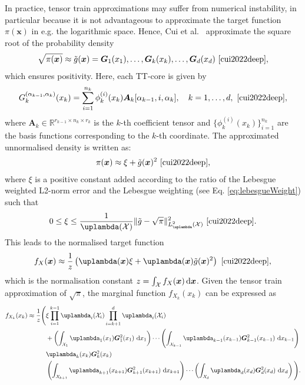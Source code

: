 In practice, tensor train approximations may suffer from numerical instability, in particular because it is not advantageous to approximate the target function $\pi(\bm{x})$ in e.g. the logarithmic space. 
Hence, Cui et al.~\cite{cui2022deep} approximate the square root of the probability density
\begin{align}
	\sqrt{\pi(\bm{x})} \approx \tilde{g}(\bm{x}) = \bm{G}_1(x_1), \dots, \bm{G}_k(x_k), \dots, \bm{G}_d(x_d)\, \,  \text{\cite[Eq. 18]{cui2022deep}},
\end{align}
which ensures positivity.
Here, each TT-core is given by
\begin{equation}
	G^{(\alpha_{k-1},\alpha_k)}_k(x_k) = \sum_{i=1}^{n_k} \phi^{(i)}_k(x_k) \bm{A}_k[\alpha_{k-1}, i, \alpha_k], \quad k = 1, \dots, d,\, \,  \text{\cite[Eq. 21]{cui2022deep}},
\end{equation}
where $\bm{A}_k \in \mathbb{R}^{r_{k-1} \times n_k \times r_k}$ is the $k$-th coefficient tensor and $\{\phi^{(i)}_k(x_k)\}_{i=1}^{n_k}$ are the basis functions corresponding to the $k$-th coordinate.
The approximated unnormalised density is written as:
\begin{align}
	\pi(\bm{x}) \approx \xi + \tilde{g}(\bm{x})^2\, \,  \text{\cite[Eq. 19]{cui2022deep}},
\end{align}
where $\xi$ is a positive constant added according to the ratio of the Lebesgue weighted L2-norm error and the Lebesgue weighting (see Eq. \ref{eq:lebesgueWeight}) such that
\begin{align}
	0 \leq \xi \leq \frac{1}{\uplambda(\mathcal{X})} \lVert \tilde{g} - \sqrt{\pi} \rVert_{L^2_{\uplambda}(\mathcal{X})}^2\, \,  \text{\cite[Eq. 35]{cui2022deep}}. \label{eq:gamErr}
\end{align}
This leads to the normalised target function
\begin{align}
	f_X(\bm{x})  \approx \frac{1}{z} \left( \uplambda(\bm{x}) \xi  + \uplambda(\bm{x}) \tilde{g}(\bm{x})^2 \right)\, \,  \text{\cite[Eq. 19]{cui2022deep}},
\end{align}
which is the normalisation constant $z = \int_{\mathcal{X}} f_X(\bm{x}) \mathop{}\!\mathrm{d} \bm{x} $.
Given the tensor train approximation of $\sqrt{\pi}$, the marginal function $f_{X_k}(x_k)$ can be expressed as
\begin{align}
	\begin{split}
		f_{X_k}(x_k)  \approx \frac{1}{z} \Bigg(&\xi \prod_{i=1}^{k-1} \uplambda_i(\mathcal{X}_i) \prod_{i=k+1}^{d} \uplambda_i(\mathcal{X}_i) \\
		&+ \left( \int_{\mathcal{X}_1} \uplambda_1(x_1) \bm{G}_1^2(x_1)  \, \diff x_1 \right) \cdots 
		\left( \int_{\mathcal{X}_{k-1}} \uplambda_{k-1}(x_{k-1}) \bm{G}_{k-1}^2(x_{k-1}) \, \diff x_{k-1} \right) \\
		& \uplambda_k(x_k) \bm{G}_k^2(x_k)  \\
		&\left( \int_{\mathcal{X}_{k+1}} \uplambda_{k+1}(x_{k+1}) \bm{G}_{k+1}^2(x_{k+1})  \,\diff x_{k+1} \right) \cdots 
		\left( \int_{\mathcal{X}_d} \uplambda_d(x_d) \bm{G}_d^2(x_d)  \, \diff x_d \right) \Bigg).
	\end{split}
\end{align}




